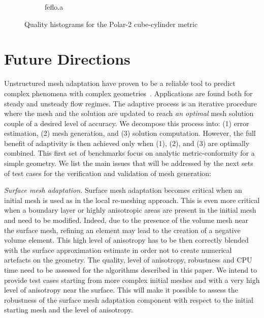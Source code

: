 \documentclass[3p,times,procedia,number]{elsarticle}
\begin{document}
\begin{figure}
\begin{subfigure}{.16\textwidth}
\caption{feflo.a}
\end{subfigure}
\caption{Quality histograms for the Polar-2 cube-cylinder metric}
\label{fig:cube-cylinder-polar-2-qualities}
\end{figure}


\section{Future Directions}

Unstructured mesh adaptation have proven to be a reliable tool to predict complex phenomena  with complex geometries~\cite{alauzet-loseille-decade-aniso-adapt-cfd,michal-unstruct-adapt-epic-dpw6}.
Applications are found both for steady and unsteady flow regimes. The adaptive process is an iterative procedure where  the mesh and
the solution are updated to reach {\it an optimal} mesh solution couple of a desired level of accuracy.
We decompose this process into:
(1) error estimation, (2) mesh generation, and (3) solution computation.
%
However, the full benefit of adaptivity is then achieved only when (1), (2), and (3) are optimally combined.
This first set of benchmarks focus on analytic metric-conformity for a simple geometry.
We list the main issues that will be addressed by the next sets of test cases  for the verification and validation of mesh generation:

\emph{Surface mesh adaptation.\;}
Surface mesh adaptation becomes critical when an initial mesh is used as in the local re-meshing approach.
This is even more critical when a boundary layer or highly anisotropic areas  are present in the initial mesh and need to be modified.
Indeed, due to the presence of the volume mesh near the surface mesh, refining an element may lead to the creation
of a negative volume element.  
This high level of anisotropy has to be then correctly blended
with the  surface approximation estimate in order not to create numerical artefacts on the geometry.
The quality, level of anisotropy, robustness and CPU time need to be assessed  for the  algorithms described in this paper.
We intend to provide test cases  starting from more complex initial meshes and with a very high level of anisotropy
near the surface. This will make it possible to assess the robustness of the surface mesh adaptation component with respect to the initial starting mesh
and the level of anisotropy.
\end{document}
